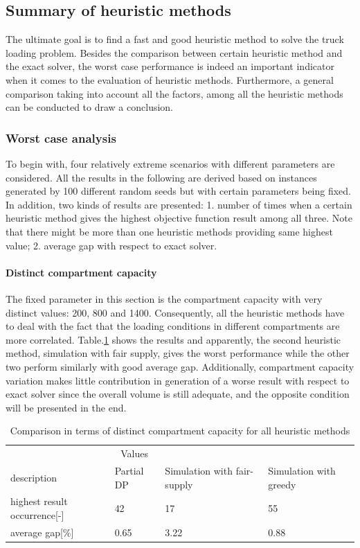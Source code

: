 \documentclass{article}
\begin{document}
\subsection{Summary of heuristic methods}
The ultimate goal is to find a fast and good heuristic method to solve the truck loading problem. Besides the comparison between certain heuristic method and the exact solver, the worst case performance is indeed an important indicator when it comes to the evaluation of heuristic methods. Furthermore, a general comparison taking into account all the factors, among all the heuristic methods can be conducted to draw a conclusion.

\subsubsection{Worst case analysis}
To begin with, four relatively extreme scenarios with different parameters are considered. All the results in the following are derived based on instances generated by 100 different random seeds but with certain parameters being fixed. In addition, two kinds of results are presented: 1. number of times when a certain heuristic method gives the highest objective function result among all three. Note that there might be more than one heuristic methods providing same highest value; 2. average gap with respect to exact solver.

\paragraph{Distinct compartment capacity}
The fixed parameter in this section is the compartment capacity with very distinct values: 200, 800 and 1400. Consequently, all the heuristic methods have to deal with the fact that the loading conditions in different compartments are more correlated. Table.\ref{tab:distinct compartment capacity for heu} shows the results and apparently, the second heuristic method, simulation with fair supply, gives the worst performance while the other two perform similarly with good average gap. Additionally, compartment capacity variation makes little contribution in generation of a worse result with respect to exact solver since the overall volume is still adequate, and the opposite condition will be presented in the end.

\begin{table}[ht]
 \caption{Comparison in terms of distinct compartment capacity for all heuristic methods}
  \centering
  \begin{tabular}{llll}
    \toprule
    \multicolumn{3}{c}{Values}                   \\
    \cmidrule(r){2-3}
    description   & Partial DP    & Simulation with fair-supply      & Simulation with greedy \\
    \midrule
    highest result occurrence[-]	&	42 	&	17 	&	55 	\\
    average gap[\%]	&	0.65 	&	3.22 	&	0.88 	\\
    \bottomrule
  \end{tabular}
  \label{tab:distinct compartment capacity for heu}
\end{table}
\end{document}
